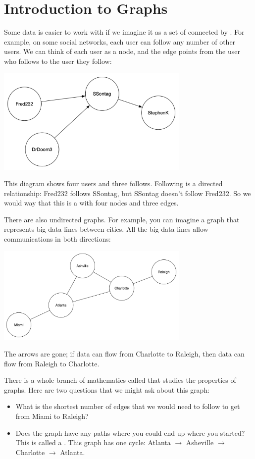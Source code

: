 \chapter{Introduction to Graphs}

Some data is easier to work with if we imagine it as a set of
 connected by .  For example, on some
social networks, each user can follow any number of other users.  We
can think of each user as a node, and the edge points from the user who
follows to the user they follow:

\includegraphics[width=0.7\textwidth]{simpledirected.png}

This diagram shows four users and three follows.  Following is a
directed relationship: Fred232 follows SSontag, but SSontag doesn't
follow Fred232.  So we would way that this is a  with four nodes and three edges.

There are also undirected graphs. For example, you can imagine a
graph that represents big data lines between cities.  All the big data
lines allow communications in both directions:

\includegraphics[width=0.7\textwidth]{simpleundirected.png}

The arrows are gone; if data can flow from Charlotte to Raleigh, then
data can flow from Raleigh to Charlotte.

There is a whole branch of mathematics called 
that studies the properties of graphs.  Here are two questions that we
might ask about this graph:
\begin{itemize}
\item What is the shortest number of edges that we would need to follow to get from Miami to Raleigh?
\item Does the graph have any paths where you could end up where you
  started? This is called a .  This graph has one
  cycle: Atlanta $\rightarrow$ Asheville $\rightarrow$ Charlotte
  $\rightarrow$ Atlanta.
\end{itemize}

